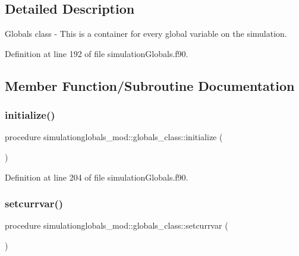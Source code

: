 \subsection{Detailed Description}
Globals class -\/ This is a container for every global variable on the simulation. 

Definition at line 192 of file simulation\+Globals.\+f90.



\subsection{Member Function/\+Subroutine Documentation}
\mbox{\label{structsimulationglobals__mod_1_1globals__class_a3b8fe335ee4571c73b774cbbe37820cf}} 
\subsubsection{\texorpdfstring{initialize()}{initialize()}}
{\footnotesize\ttfamily procedure simulationglobals\+\_\+mod\+::globals\+\_\+class\+::initialize (\begin{DoxyParamCaption}{ }\end{DoxyParamCaption})\hspace{0.3cm}{\ttfamily [private]}}



Definition at line 204 of file simulation\+Globals.\+f90.

\mbox{\label{structsimulationglobals__mod_1_1globals__class_ae1d8dcce038856889fec915c28a054ce}} 
\subsubsection{\texorpdfstring{setcurrvar()}{setcurrvar()}}
{\footnotesize\ttfamily procedure simulationglobals\+\_\+mod\+::globals\+\_\+class\+::setcurrvar (\begin{DoxyParamCaption}{ }\end{DoxyParamCaption})\hspace{0.3cm}{\ttfamily [private]}}



